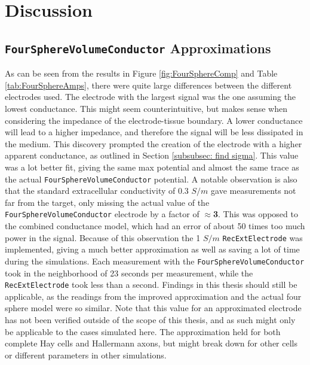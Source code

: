\documentclass[final, a4paper,masters,en,listoffigures,listoftables,norwegiandates]{NMBU}
\begin{document}
\clearpage
\section{Discussion}
\subsection{\texttt{FourSphereVolumeConductor} Approximations}
As can be seen from the results in Figure \ref{fig:FourSphereComp} and Table \ref{tab:FourSphereAmps}, there were quite large differences between the different electrodes used. The electrode with the largest signal was the one assuming the lowest conductance. This might seem counterintuitive, but makes sense when considering the impedance of the electrode-tissue boundary. A lower conductance will lead to a higher impedance, and therefore the signal will be less dissipated in the medium. This discovery prompted the creation of the electrode with a higher apparent conductance, as outlined in Section \ref{subsubsec: find sigma}. This value was a lot better fit, giving the same max potential and almost the same trace as the actual \texttt{FourSphereVolumeConductor} potential. A notable observation is also that the standard extracellular conductivity of 0.3 $S/m$ gave measurements not far from the target, only missing the actual value of the \texttt{FourSphereVolumeConductor} electrode by a factor of \textbf{$\approx$3}. This was opposed to the combined conductance model, which had an error of about 50 times too much power in the signal. Because of this observation the 1 $S/m$ \texttt{RecExtElectrode} was implemented, giving a much better approximation as well as saving a lot of time during the simulations. Each measurement with the \texttt{FourSphereVolumeConductor} took in the neighborhood of 23 seconds per measurement, while the \texttt{RecExtElectrode} took less than a second. Findings in this thesis should still be applicable, as the readings from the improved approximation and the actual four sphere model were so similar.
Note that this value for an approximated electrode has not been verified outside of the scope of this thesis, and as such might only be applicable to the cases simulated here. The approximation held for both complete Hay cells and Hallermann axons, but might break down for other cells or different parameters in other simulations. 
\end{document}
